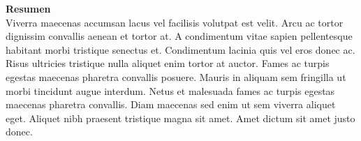 \Huge
\textbf{Resumen}\\

\normalsize
Viverra maecenas accumsan lacus vel facilisis volutpat est velit. Arcu ac tortor dignissim convallis aenean et tortor at. A condimentum vitae sapien pellentesque habitant morbi tristique senectus et. Condimentum lacinia quis vel eros donec ac. Risus ultricies tristique nulla aliquet enim tortor at auctor. Fames ac turpis egestas maecenas pharetra convallis posuere. Mauris in aliquam sem fringilla ut morbi tincidunt augue interdum. Netus et malesuada fames ac turpis egestas maecenas pharetra convallis. Diam maecenas sed enim ut sem viverra aliquet eget. Aliquet nibh praesent tristique magna sit amet. Amet dictum sit amet justo donec.